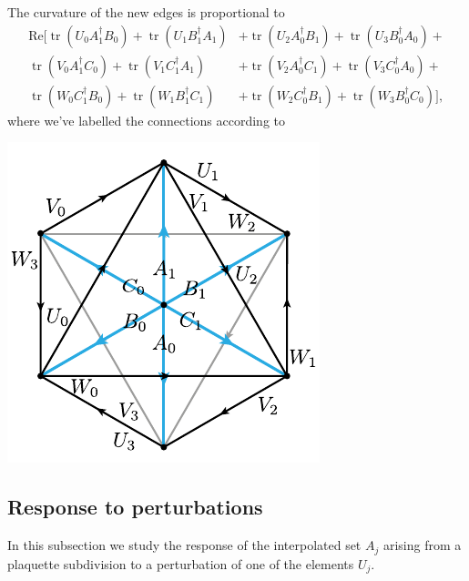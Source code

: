 \documentclass[12pt]{amsart}
\newcommand{\tr}{\operatorname{tr}}
\theoremstyle{definition}
\theoremstyle{remark}
\numberwithin{equation}{section}
\begin{document}
The curvature of the new edges is proportional to
\begin{equation}
	\begin{split}
		\text{Re}\Big[	\tr(U_0 A_1^\dag B_0) + \tr(U_1 B_1^\dag A_1) &+ \tr(U_2 A_0^\dag B_1) + \tr(U_3 B_0^\dag A_0) +  \\
						\tr(V_0 A_1^\dag C_0) + \tr(V_1 C_1^\dag A_1) &+ \tr(V_2 A_0^\dag C_1) + \tr(V_3 C_0^\dag A_0) + \\
						\tr(W_0 C_1^\dag B_0) + \tr(W_1 B_1^\dag C_1) &+ \tr(W_2 C_0^\dag B_1) + \tr(W_3 B_0^\dag C_0)\Big],
	\end{split}
\end{equation}
where we've labelled the connections according to
 \begin{center}
	\includegraphics{diamondconn.pdf}
\end{center}



\subsection{Response to perturbations}
In this subsection we study the response of the interpolated set $A_j$ arising from a plaquette subdivision to a perturbation of one of the elements $U_j$.
\end{document}

